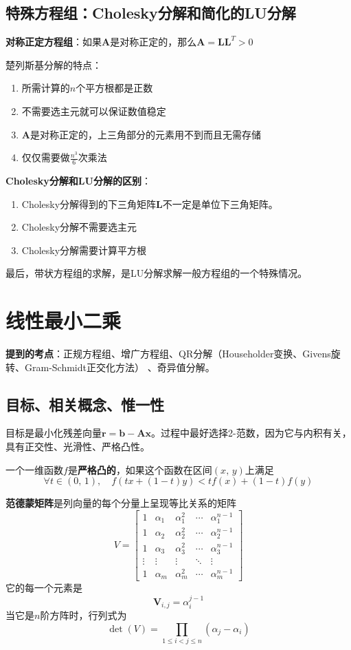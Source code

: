\documentclass[14pt, letterpaper, UTF8, fontset=windowsnew, heading=true]{article}
\begin{document}
\subsection{特殊方程组：Cholesky分解和简化的LU分解}

\par
\textbf{对称正定方程组}：如果$\bm{A}$是对称正定的，那么$\bm{A}=\bm{LL}^T>0$
\par
楚列斯基分解的特点：
\begin{enumerate}
	\item
	所需计算的$n$个平方根都是正数
	\item
	不需要选主元就可以保证数值稳定
	\item
	$\bm{A}$是对称正定的，上三角部分的元素用不到而且无需存储
	\item
	仅仅需要做$\frac{n^3}{6}$次乘法
\end{enumerate}
\par
\textbf{Cholesky分解和LU分解的区别}：
\begin{enumerate}
	\item
	Cholesky分解得到的下三角矩阵$\bm{L}$不一定是单位下三角矩阵。
	\item
	Cholesky分解不需要选主元
	\item
	Cholesky分解需要计算平方根
\end{enumerate}

\par
最后，带状方程组的求解，是LU分解求解一般方程组的一个特殊情况。

\section{线性最小二乘}

\textbf{提到的考点}：正规方程组、增广方程组、QR分解（Householder变换、Givens旋转、Gram-Schmidt正交化方法）
、奇异值分解。

\subsection{目标、相关概念、惟一性}

\par
目标是最小化残差向量$\bm{r}=\bm{b}-\bm{Ax}$。过程中最好选择2-范数，因为它与内积有关，具有正交性、光滑性、严格凸性。
\par
一个一维函数$f$是\textbf{严格凸的}，如果这个函数在区间$(x,\,y)$上满足
$$\forall t\in (0,\,1),\quad f(tx+(1-t)y)<tf(x)+(1-t)f(y)$$
\par
\textbf{范德蒙矩阵}是列向量的每个分量上呈现等比关系的矩阵
$$V=\begin{bmatrix}1&\alpha_{1}&\alpha_{1}^{2}&\cdots &\alpha_{1}^{n-1}\\
1&\alpha_{2}&\alpha_{2}^{2}&\cdots &\alpha_{2}^{n-1}\\
1&\alpha_{3}&\alpha_{3}^{2}&\cdots &\alpha_{3}^{n-1}\\
\vdots &\vdots &\vdots &\ddots &\vdots \\
1&\alpha_{m}&\alpha_{m}^{2}&\cdots &\alpha_{m}^{n-1}
\end{bmatrix}$$
它的每一个元素是
$$\bm{V}_{i,j}=\alpha_i^{j-1}$$
当它是$n$阶方阵时，行列式为
$$\det(V)=\prod _{1\leq i<j\leq n}(\alpha _{j}-\alpha _{i})$$
\end{document}
